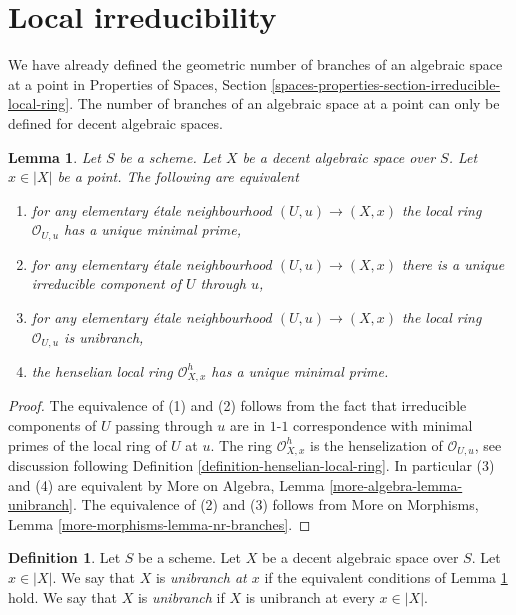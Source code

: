 \documentclass{stacks-project}
\theoremstyle{plain}
\newtheorem{lemma}[subsection]{Lemma}
\theoremstyle{definition}
\newtheorem{definition}[subsection]{Definition}
\theoremstyle{remark}
\numberwithin{equation}{subsection}
\begin{document}
\section{Local irreducibility}
\label{section-irreducible-local-ring}

\noindent
We have already defined the geometric number of branches of an
algebraic space at a point in Properties of Spaces, Section
\ref{spaces-properties-section-irreducible-local-ring}.
The number of branches of an algebraic space at a point can only
be defined for decent algebraic spaces.

\begin{lemma}
\label{lemma-irreducible-local-ring}
Let $S$ be a scheme. Let $X$ be a decent algebraic space over $S$.
Let $x \in |X|$ be a point. The following are equivalent
\begin{enumerate}
\item for any elementary \'etale neighbourhood $(U, u) \to (X, x)$
the local ring $\mathcal{O}_{U, u}$ has a unique minimal prime,
\item for any elementary \'etale neighbourhood $(U, u) \to (X, x)$
there is a unique irreducible component of $U$ through $u$,
\item for any elementary \'etale neighbourhood $(U, u) \to (X, x)$
the local ring $\mathcal{O}_{U, u}$ is unibranch,
\item the henselian local ring
$\mathcal{O}_{X, x}^h$ has a unique minimal prime.
\end{enumerate}
\end{lemma}

\begin{proof}
The equivalence of (1) and (2) follows from the fact that irreducible
components of $U$ passing through $u$ are in $1$-$1$ correspondence with
minimal primes of the local ring of $U$ at $u$. The ring
$\mathcal{O}_{X, x}^h$ is the henselization of $\mathcal{O}_{U, u}$, see
discussion following Definition \ref{definition-henselian-local-ring}.
In particular (3) and (4) are equivalent by
More on Algebra, Lemma \ref{more-algebra-lemma-unibranch}.
The equivalence of (2) and (3) follows from
More on Morphisms, Lemma \ref{more-morphisms-lemma-nr-branches}.
\end{proof}

\begin{definition}
\label{definition-unibranch}
Let $S$ be a scheme. Let $X$ be a decent algebraic space over $S$.
Let $x \in |X|$. We say that $X$ is {\it unibranch at $x$}
if the equivalent conditions of
Lemma \ref{lemma-irreducible-local-ring} hold.
We say that $X$ is {\it unibranch} if $X$ is
unibranch at every $x \in |X|$.
\end{definition}
\end{document}
